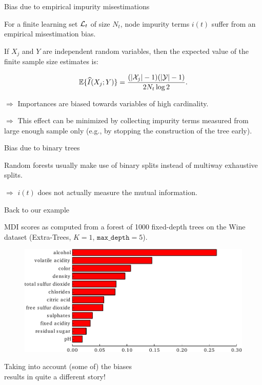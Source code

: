 \documentclass{beamer}
\begin{document}
\begin{frame}{Bias due to empirical impurity misestimations}

For a finite learning set ${\cal L}_t$ of size $N_t$, node impurity terms $i(t)$
suffer from an empirical misestimation bias.

\bigskip

If $X_j$ and $Y$ are independent random variables, then the expected value of
the finite sample size estimates   is:

\begin{equation*}
\mathbb{E}\{ \widehat{I}(X_j; Y) \} = \frac{(|{\cal X}_j|-1)(|{\cal Y}|-1)}{2 N_t \log 2}.
\end{equation*}

{\color{red}$\Rightarrow$ Importances are biased towards variables of  high
cardinality.}

\medskip

{\color{blue}$\Rightarrow$ This effect can be minimized by collecting impurity
terms measured from large enough sample only} (e.g., by stopping the
construction of the tree early).

\end{frame}

\begin{frame}{Bias due to binary trees}

Random forests usually make use of binary splits instead of multiway exhaustive
splits.

\bigskip

{\color{red}$\Rightarrow$ $i(t)$ does not actually measure the mutual
information.}


\end{frame}

\begin{frame}{Back to our example}

MDI scores as computed from a forest of 1000 fixed-depth trees on the  Wine
dataset (Extra-Trees, $K=1$, $\texttt{max\_depth}=5$).

\begin{figure}
    \includegraphics[scale=0.7]{./figures/imp-wine2.pdf}
\end{figure}

\begin{center}
Taking into account (some of) the biases\\
results in {\color{red} quite a different story}!
\end{center}

\end{frame}
\end{document}
